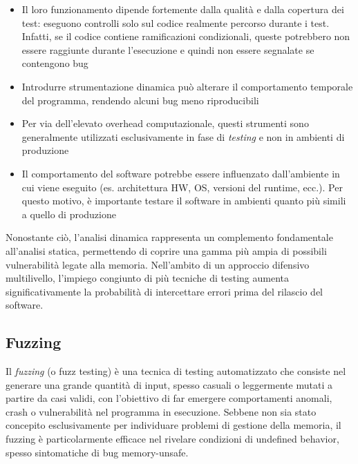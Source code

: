 \begin{itemize}
  \item Il loro funzionamento dipende fortemente dalla qualità e dalla copertura
    dei test: eseguono controlli solo sul codice realmente percorso durante i
    test. Infatti, se il codice contiene ramificazioni condizionali, queste potrebbero
    non essere raggiunte durante l'esecuzione e quindi non essere segnalate se contengono
    bug

  \item Introdurre strumentazione dinamica può alterare il comportamento temporale
    del programma, rendendo alcuni bug meno riproducibili

  \item Per via dell'elevato overhead computazionale, questi strumenti sono
    generalmente utilizzati esclusivamente in fase di \textit{testing} e non in ambienti
    di produzione

  \item Il comportamento del software potrebbe essere influenzato dall'ambiente in
    cui viene eseguito (es. architettura HW, OS, versioni del runtime, ecc.). Per
    questo motivo, è importante testare il software in ambienti quanto più
    simili a quello di produzione
\end{itemize}

Nonostante ciò, l'analisi dinamica rappresenta un complemento fondamentale all'analisi
statica, permettendo di coprire una gamma più ampia di possibili vulnerabilità legate
alla memoria. Nell'ambito di un approccio difensivo multilivello, l'impiego congiunto
di più tecniche di testing aumenta significativamente la probabilità di intercettare
errori prima del rilascio del software.

\subsection{Fuzzing}
\label{sec:fuzzing}

Il \textit{fuzzing} (o fuzz testing) è una tecnica di testing automatizzato che consiste
nel generare una grande quantità di input, spesso casuali o leggermente mutati a
partire da casi validi, con l'obiettivo di far emergere comportamenti anomali,
crash o vulnerabilità nel programma in esecuzione. Sebbene non sia stato concepito
esclusivamente per individuare problemi di gestione della memoria, il fuzzing è
particolarmente efficace nel rivelare condizioni di undefined behavior, spesso sintomatiche
di bug memory-unsafe.

